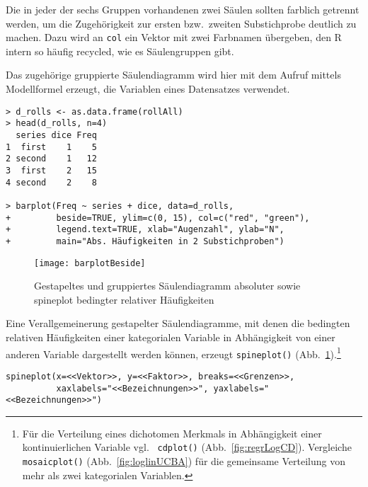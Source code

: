 Die in jeder der sechs Gruppen vorhandenen zwei Säulen sollten farblich getrennt werden, um die Zugehörigkeit zur ersten bzw.\ zweiten Substichprobe deutlich zu machen. Dazu wird an \lstinline!col! ein Vektor mit zwei Farbnamen übergeben, den R intern so häufig recycled, wie es Säulengruppen gibt.

Das zugehörige gruppierte Säulendiagramm wird hier mit dem Aufruf mittels Modellformel erzeugt, die Variablen eines Datensatzes verwendet.
\begin{lstlisting}
> d_rolls <- as.data.frame(rollAll)
> head(d_rolls, n=4)
  series dice Freq
1  first    1    5
2 second    1   12
3  first    2   15
4 second    2    8

> barplot(Freq ~ series + dice, data=d_rolls,
+         beside=TRUE, ylim=c(0, 15), col=c("red", "green"),
+         legend.text=TRUE, xlab="Augenzahl", ylab="N",
+         main="Abs. Häufigkeiten in 2 Substichproben")
\end{lstlisting}

\begin{figure}[ht]
\centering
\texttt{[image: barplotBeside]}
\vspace*{-1em}
\caption{Gestapeltes und gruppiertes Säulendiagramm absoluter sowie spineplot bedingter relativer Häufigkeiten}
\label{fig:barplotBeside}
\end{figure}

Eine Verallgemeinerung gestapelter Säulendiagramme, mit denen die bedingten relativen Häufigkeiten einer kategorialen Variable in Abhängigkeit von einer anderen Variable dargestellt werden können, erzeugt \lstinline!spineplot()! (Abb.\ \ref{fig:barplotBeside}).\footnote{Für die Verteilung eines dichotomen Merkmals in Abhängigkeit einer kontinuierlichen Variable vgl.\  \lstinline!cdplot()! (Abb.\ \ref{fig:regrLogCD}). Vergleiche \lstinline!mosaicplot()! (Abb.\ \ref{fig:loglinUCBA}) für die gemeinsame Verteilung von mehr als zwei kategorialen Variablen.}
\begin{lstlisting}
spineplot(x=<<Vektor>>, y=<<Faktor>>, breaks=<<Grenzen>>,
          xaxlabels="<<Bezeichnungen>>", yaxlabels="<<Bezeichnungen>>")
\end{lstlisting}

